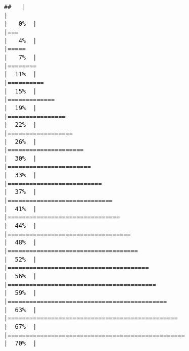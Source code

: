 \documentclass[
]{article}
\begin{document}
\begin{verbatim}
##   |                                                                              |                                                                      |   0%  |                                                                              |===                                                                   |   4%  |                                                                              |=====                                                                 |   7%  |                                                                              |========                                                              |  11%  |                                                                              |==========                                                            |  15%  |                                                                              |=============                                                         |  19%  |                                                                              |================                                                      |  22%  |                                                                              |==================                                                    |  26%  |                                                                              |=====================                                                 |  30%  |                                                                              |=======================                                               |  33%  |                                                                              |==========================                                            |  37%  |                                                                              |=============================                                         |  41%  |                                                                              |===============================                                       |  44%  |                                                                              |==================================                                    |  48%  |                                                                              |====================================                                  |  52%  |                                                                              |=======================================                               |  56%  |                                                                              |=========================================                             |  59%  |                                                                              |============================================                          |  63%  |                                                                              |===============================================                       |  67%  |                                                                              |=================================================                     |  70%  |                                                                              
\end{verbatim}
\end{document}
